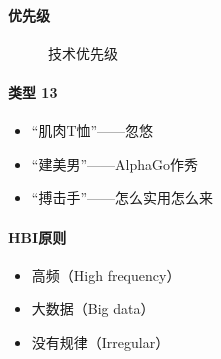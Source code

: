 \documentclass[letterpaper,10pt,english]{sphinxmanual}
\begin{document}
\paragraph{优先级}
\label{\detokenize{chapter_introduction/AI:id12}}
\begin{figure}[H]
\centering
\capstart

\noindent{}
\caption{技术优先级\sphinxfootnotemark[222]}\label{\detokenize{chapter_introduction/AI:id38}}\end{figure}
%
\begin{footnotetext}[222]\sphinxAtStartFootnote
{}
%
\end{footnotetext}\ignorespaces 

\paragraph{类型 13\sphinxfootnotemark[223]}
\label{\detokenize{chapter_introduction/AI:id13}}%
\begin{footnotetext}[223]\sphinxAtStartFootnote
{}
%
\end{footnotetext}\ignorespaces \begin{itemize}
\item {} 
“肌肉T恤”——忽悠

\item {} 
“建美男”——AlphaGo作秀

\item {} 
“搏击手”——怎么实用怎么来

\end{itemize}


\paragraph{HBI原则}
\label{\detokenize{chapter_introduction/AI:hbi}}\begin{itemize}
\item {} 
高频（High frequency）

\item {} 
大数据（Big data）

\item {} 
没有规律（Irregular）

\end{itemize}
\end{document}

